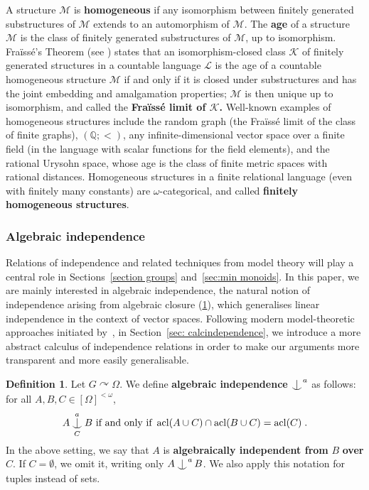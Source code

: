 \documentclass{article}
\theoremstyle{remark}
\theoremstyle{definition}
\newtheorem{definition}[theorem]{Definition}
\def\acts{\curvearrowright}
\DeclareMathOperator{\acl}{acl}
\newcommand{\M}[0]{\mathcal{M}}
\def\Ind#1#2{#1\setbox0=\hbox{$#1x$}\kern\wd0\hbox to 0pt{\hss$#1\mid$\hss}
	\lower.9\ht0\hbox to 0pt{\hss$#1\smile$\hss}\kern\wd0}
\def\ind{\mathop{\mathpalette\Ind{}}}
\begin{document}
{{{{A  structure $\M$ is \textbf{homogeneous} if any isomorphism between finitely generated substructures of $\M$ extends to an automorphism of $\M$. The \textbf{age} of a structure $\M$ is the class of finitely generated substructures of $\M$, up to isomorphism. Fra\"{i}ss\'{e}'s Theorem (see \cite[Theorem 4.4.4]{tent2012course}) states that an isomorphism-closed  class $\mathcal{K}$ of finitely generated structures in a countable language $\mathcal{L}$ is the age of a countable homogeneous structure $\mathcal{M}$ if and only if it is closed under substructures and has the joint embedding and amalgamation properties; $\mathcal{M}$ is then unique up to isomorphism, and called the \textbf{Fra\"{i}ss\'{e} limit of $\mathcal{K}$.} 
 Well-known examples of  homogeneous structures include the random graph (the Fra\"{i}ss\'{e} limit of the class of finite graphs),  $(\mathbb{Q};<)$, any infinite-dimensional vector space over a finite field (in the language with scalar functions for the field elements), and the rational Urysohn space, whose age {is the class of} finite metric spaces with rational distances. Homogeneous structures in a finite relational language (even with finitely many constants) are $\omega$-categorical, and called \textbf{finitely homogeneous structures}. 



 

\subsubsection{Algebraic independence}

 {Relations of independence and related techniques from model theory will play a central role in Sections~\ref{section groups} and~\ref{sec:min monoids}. In this paper, we are mainly interested in algebraic independence, the natural notion of independence arising from algebraic closure (\cref{def:alg ind}),  which generalises linear independence in the context of vector spaces. Following modern model-theoretic approaches initiated by~\cite{adler2005explanation, adler2009geometric}, in Section~\ref{sec: calcindependence}, we introduce a more abstract calculus of %
 independence relations %
  in order to make our arguments more transparent and more easily generalisable.}  

 \begin{definition} \label{def:alg ind}
 {Let $G\acts\Omega$.} %
     We define \textbf{algebraic independence} $\ind^{a}$ as follows: for all %
    $A,B,C\in[\Omega]^{<\omega}$,
    \[A\ind^{a}_C B \text{ if and only if } \acl(A\cup C)\cap\acl(B \cup C)=\acl(C)\;.\]
        {In the above setting, we say that $A$  is \textbf{ algebraically independent from} $B$ \textbf{over} $C$.}
    {If $C=\emptyset$, we omit it, writing only %
    ${A\ind^a B}$.  
    We also apply this notation for tuples instead of sets.}
    \end{definition}

}}}}
\end{document}

